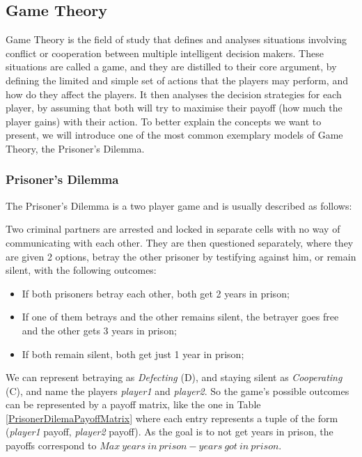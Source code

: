 \subsection{Game Theory}
\label{subsec:GameTheory}
Game Theory is the field of study that defines and analyses situations involving conflict or cooperation between multiple intelligent decision makers. These situations are called a game, and they are distilled to their core argument, by defining the limited and simple set of actions that the players may perform, and how do they affect the players. It then analyses the decision strategies for each player, by assuming that both will try to maximise their payoff (how much the player gains) with their action. To better explain the concepts we want to present, we will introduce one of the most common exemplary models of Game Theory, the Prisoner's Dilemma.

\subsubsection{Prisoner's Dilemma}
\label{subsubsec:PrisonersDilemma}
The Prisoner's Dilemma is a two player game and is usually described as follows:

Two criminal partners are arrested and locked in separate cells with no way of communicating with each other. They are then questioned separately, where they are given 2 options, betray the other prisoner by testifying against him, or remain silent, with the following outcomes:
\begin{itemize}
	\item If both prisoners betray each other, both get 2 years in prison;
	\item If one of them betrays and the other remains silent, the betrayer goes free and the other gets 3 years in prison;
	\item If both remain silent, both get just 1 year in prison;
\end{itemize}

We can represent betraying as \textit{Defecting} (D), and staying silent as \textit{Cooperating} (C), and name the players \textit{player1} and \textit{player2}. So the game's possible outcomes can be represented by a payoff matrix, like the one in Table \ref{PrisonerDilemaPayoffMatrix} where each entry represents a tuple of the form (\textit{player1} payoff, \textit{player2} payoff). As the goal is to not get years in prison, the payoffs correspond to $Max\ years\ in\ prison - years\ got\ in\ prison$.

